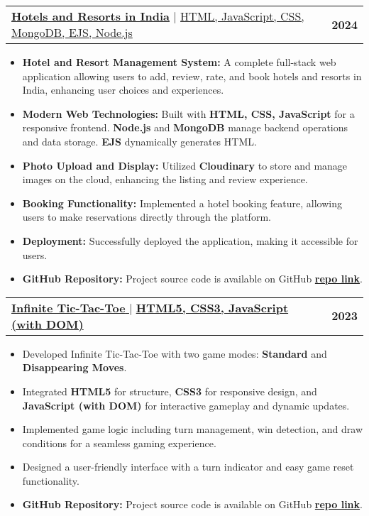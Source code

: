 \documentclass[letterpaper,11pt]{article}
\makeatletter
\newcommand{\resumeItem}[1]{
  \item\small{
    {#1 \vspace{-2pt}}
  }
}
\newcommand{\resumeProjectHeading}[2]{
    \item
    \begin{tabular*}{1.001\textwidth}{l@{\extracolsep{\fill}}r}
      \small#1 & \textbf{\small #2}\\
    \end{tabular*}\vspace{-7pt}
}
\newcommand{\resumeItemListStart}{\begin{itemize}}
\newcommand{\resumeItemListEnd}{\end{itemize}\vspace{-5pt}}
\makeatother
\begin{document}
    \resumeProjectHeading
    {\href{https://luxury-lodgings-in-india.onrender.com/}{\textbf{\large{\underline{Hotels and Resorts in India}}}} \href{Project Link}{\raisebox{-0.1\height}{\faExternalLink}} $|$ \large{\underline{HTML, JavaScript, CSS, MongoDB, EJS, Node.js}}}{2024}
\resumeItemListStart
\resumeItem{\textbf{Hotel and Resort Management System:} A complete full-stack web application allowing users to add, review, rate, and book hotels and resorts in India, enhancing user choices and experiences.}
\resumeItem{\textbf{Modern Web Technologies:} Built with \textbf{HTML, CSS, JavaScript} for a responsive frontend. \textbf{Node.js} and \textbf{MongoDB} manage backend operations and data storage. \textbf{EJS} dynamically generates HTML.}
\resumeItem{\textbf{Photo Upload and Display:} Utilized \textbf{Cloudinary} to store and manage images on the cloud, enhancing the listing and review experience.}
\resumeItem{\textbf{Booking Functionality:} Implemented a hotel booking feature, allowing users to make reservations directly through the platform.}
\resumeItem{\textbf{Deployment:} Successfully deployed the application, making it accessible for users.}
\resumeItem{\textbf{GitHub Repository:} Project source code is available on GitHub \href{https://github.com/singhsoumya0109/Luxury-Lodgings-in-India}{\textbf{{repo link}}}.}

\resumeItemListEnd
\vspace{-16pt}

      \resumeProjectHeading
    {\href{https://singhsoumya0109.github.io/Infinite-Tic-Tac-Toe/}{\textbf{\large{\underline{Infinite Tic-Tac-Toe}}} \href{Project Link}{\raisebox{-0.1\height}{\faExternalLink}}} $|$ \large{\underline{\textbf{HTML5, CSS3, JavaScript (with DOM)}}}}{2023}
\resumeItemListStart
    \resumeItem{\normalsize{Developed Infinite Tic-Tac-Toe with two game modes: \textbf{Standard} and \textbf{Disappearing Moves}.}}
    \resumeItem{\normalsize{Integrated \textbf{HTML5} for structure, \textbf{CSS3} for responsive design, and \textbf{JavaScript (with DOM)} for interactive gameplay and dynamic updates.}}
    \resumeItem{\normalsize{Implemented game logic including turn management, win detection, and draw conditions for a seamless gaming experience.}}
    \resumeItem{\normalsize{Designed a user-friendly interface with a turn indicator and easy game reset functionality.}}
    \resumeItem{\textbf{GitHub Repository:} Project source code is available on GitHub \href{https://github.com/singhsoumya0109/Infinite-Tic-Tac-Toe}{\textbf{{repo link}}}.}
\resumeItemListEnd
\vspace{-14pt}
\end{document}
